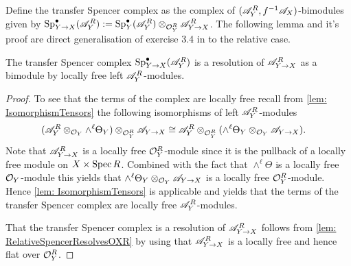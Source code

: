     Define the transfer Spencer complex as the complex of  $(\mathscr{A}_Y^R,f^{-1}\mathscr{A}_X)$-bimodules given by $\operatorname{Sp}^\bullet_{Y\to X}(\mathscr{A}_Y^R) := \operatorname{Sp}^\bullet_Y(\mathscr{A}_Y^R) \otimes_{\mathcal{O}_Y^R}\mathscr{A}_{Y \to X}^R$.
    The following lemma and it's proof are direct generalisation of exercise 3.4 in \cite{sabbah2011introduction} to the relative case.
    \begin{lemma}\label{lem: SpencerResolutionTransferModule}
      The transfer Spencer complex $\operatorname{Sp}^\bullet_{Y\to X}(\mathscr{A}_Y^R)$ is a resolution of $\mathscr{A}_{Y\to X}^R$ as a bimodule by locally free left $\mathscr{A}_Y^R$-modules.
    \end{lemma}
    \begin{proof}
       To see that the terms of the complex are locally free recall from \cref{lem: IsomorphismTensors} the following isomorphisms of left $\mathscr{A}_Y^R$-modules
        \begin{align*}
           (\mathscr{A}_Y^R \otimes_{\mathcal{O}_Y} \wedge^\ell\Theta_Y )\otimes_{\mathcal{O}_Y^R}\mathscr{A}_{Y\to X} &
           \cong \mathscr{A}_Y^R \otimes_{\mathcal{O}_Y^R}(  \wedge^\ell\Theta_Y \otimes_{\mathcal{O}_Y}\mathscr{A}_{Y\to X}).
        \end{align*}
      Note that $\mathscr{A}_{Y\to X}^R$ is a locally free $\mathcal{O}_Y^R$-module since it is the pullback of a locally free module on $X\times \operatorname{Spec} R$.
      Combined with the fact that $\wedge^\ell \Theta$ is a locally free $\mathcal{O}_Y$-module this yields that $ \wedge^\ell\Theta_Y \otimes_{\mathcal{O}_Y}\mathscr{A}_{Y\to X}$ is a locally free $\mathcal{O}_Y^R$-module.
      Hence \cref{lem: IsomorphismTensors} is applicable and yields that the terms of the transfer Spencer complex are locally free $\mathscr{A}_Y^R$-modules.

      That the transfer Spencer complex is a resolution of $\mathscr{A}_{Y\to X}^R$ follows from \cref{lem: RelativeSpencerResolvesOXR} by using that $\mathscr{A}_{Y\to X}^R$ is a locally free and hence flat over $\mathcal{O}_Y^R$.
    \end{proof}


